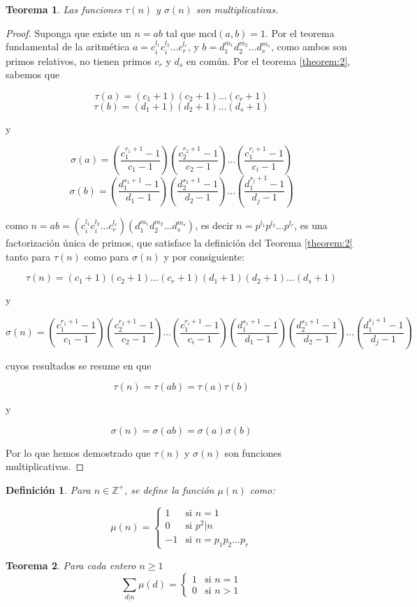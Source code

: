 \documentclass{article}
\newtheorem{theorem}{Teorema}[]
\newtheorem{definition}{Definición}[]
\begin{document}
\begin{theorem}
	Las funciones $\tau(n)$ y $\sigma(n)$ son multiplicativas.
\end{theorem}
\begin{proof} Suponga que existe un $n = ab$ tal que mcd$(a,b) = 1$. Por el teorema fundamental de la aritmética $a = c^{l_1}_i c^{l_2}_i \dots c^{l_r}_r$, y $b = d^{m_1}_1 d^{m_2}_2 \dots d^{m_s}_s$, como ambos son primos relativos, no tienen primos $c_r$ y $d_s$ en común. Por el teorema \ref{theorem:2}, sabemos que
	
	$$\tau(a) = (c_1 + 1) (c_2 + 1) \dots (c_r + 1)$$
	$$\tau(b) = (d_1 + 1) (d_2 + 1) \dots (d_s + 1)$$

y

$$\sigma(a) = \left( \frac{c^{r_1 + 1}_1 - 1}{c_1 - 1} \right) \left( \frac{c^{r_2 + 1}_2 - 1}{c_2 - 1} \right) \dots \left( \frac{c^{r_i + 1}_1 - 1}{c_i - 1} \right)$$
$$\sigma(b) = \left( \frac{d^{s_1 + 1}_1 - 1}{d_1 - 1} \right) \left( \frac{d^{s_2 + 1}_2 - 1}{d_2 - 1} \right) \dots \left( \frac{d^{s_j + 1}_1 - 1}{d_j - 1} \right)$$

como $n = ab =  (c^{l_1}_i c^{l_2}_i \dots c^{l_r}_r) (d^{m_1}_1 d^{m_2}_2 \dots d^{m_s}_s)$, es decir $n = p^{l_1} p^{l_2} \dots p^{l_r}$, es una factorización única de primos, que satisface la definición del Teorema \ref{theorem:2} tanto para $\tau(n)$ como para $\sigma(n)$ y por consiguiente:

$$\tau(n) = (c_1 + 1) (c_2 + 1) \dots (c_r + 1) (d_1 + 1) (d_2 + 1) \dots (d_s + 1)$$

y

$$\sigma(n) = \left( \frac{c^{r_1 + 1}_1 - 1}{c_1 - 1} \right) \left( \frac{c^{r_2 + 1}_2 - 1}{c_2 - 1} \right) \dots \left( \frac{c^{r_i + 1}_1 - 1}{c_i - 1} \right) \left( \frac{d^{s_1 + 1}_1 - 1}{d_1 - 1} \right) \left( \frac{d^{s_2 + 1}_2 - 1}{d_2 - 1} \right) \dots \left( \frac{d^{s_j + 1}_1 - 1}{d_j - 1} \right)$$

cuyos resultados se resume en que
 
$$\tau(n) = \tau(ab) = \tau(a) \tau(b)$$

y

$$\sigma(n) = \sigma(ab) = \sigma(a) \sigma(b)$$

Por lo que hemos demostrado que $\tau(n)$ y $\sigma(n)$ son funciones multiplicativas.
\end{proof}

\begin{definition}
	Para $n \in \mathbb{Z}^+$, se define la función $\mu(n)$ como:
	
	\[
		\mu(n) =
		\begin{cases}
			1 & \text{si } n = 1\\
			0 & \text{si } p^2|n\\
			-1 & \text{si } n = p_1 p_2 \dots p_r
		\end{cases} 
	\] 
\end{definition}

\begin{theorem}
	Para cada entero $n \geq 1$
	\[
		\sum_{d|n} \mu(d) = 
		\begin{cases} 
			1 & \text{si } n = 1 \\			
			0 & \text{si } n > 1 
		\end{cases}
	\]
\end{theorem}
\nocite{*}


\end{document}
